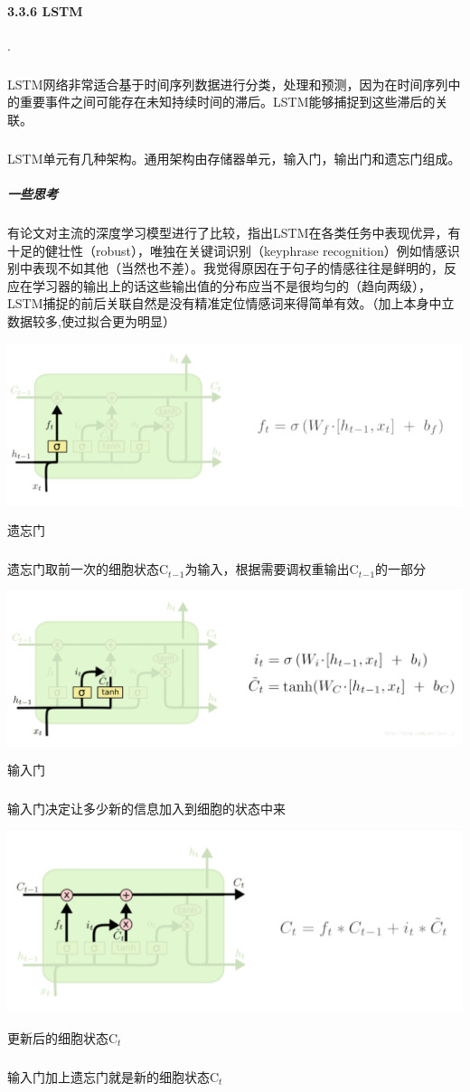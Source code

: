 \documentclass[UTF8]{article}
\begin{document}



\paragraph{\large 3.3.6 LSTM}.
\subparagraph{}LSTM网络非常适合基于时间序列数据进行分类，处理和预测，因为在时间序列中的重要事件之间可能存在未知持续时间的滞后。LSTM能够捕捉到这些滞后的关联。
\subparagraph{}LSTM单元有几种架构。通用架构由存储器单元，输入门，输出门和遗忘门组成。
\subparagraph{一些思考} 有论文对主流的深度学习模型进行了比较，指出LSTM在各类任务中表现优异，有十足的健壮性（robust），唯独在关键词识别（keyphrase recognition）例如情感识别中表现不如其他（当然也不差）。我觉得原因在于句子的情感往往是鲜明的，反应在学习器的输出上的话这些输出值的分布应当不是很均匀的（趋向两级），LSTM捕捉的前后关联自然是没有精准定位情感词来得简单有效。（加上本身中立数据较多,使过拟合更为明显）


\begin{center} %
\includegraphics[width=0.8\linewidth]{1.PNG}
\end{center}
\centerline{遗忘门}
\subparagraph{}遗忘门取前一次的细胞状态C$_t$$_-$$_1$为输入，根据需要调权重输出C$_t$$_-$$_1$的一部分

\begin{center}
\includegraphics[width=0.8\linewidth]{2.PNG}
\end{center}
\centerline{输入门}
\subparagraph{}输入门决定让多少新的信息加入到细胞的状态中来

\begin{center}
\includegraphics[width=0.8\linewidth]{3.PNG}
\end{center}
\centerline{更新后的细胞状态C$_t$}
\subparagraph{}输入门加上遗忘门就是新的细胞状态C$_t$
\end{document}
